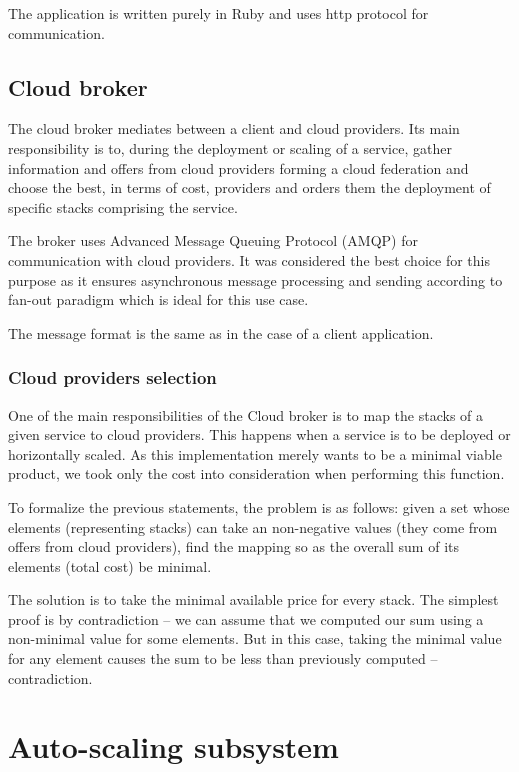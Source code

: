 The application is written purely in Ruby and uses http protocol for communication. 

\subsection{Cloud broker}
The cloud broker mediates between a client and cloud providers. Its main responsibility is to, during the deployment or scaling of a service, gather information and offers from cloud providers forming a cloud federation and choose the best, in terms of cost, providers and orders them the deployment of specific stacks comprising the service.

The broker uses Advanced Message Queuing Protocol (AMQP) for communication with cloud providers. It was considered the best choice for this purpose as it ensures asynchronous message processing and sending according to fan-out paradigm which is ideal for this use case.

The message format is the same as in the case of a client application.

\subsubsection{Cloud providers selection}
One of the main responsibilities of the Cloud broker is to map the stacks of a given service to cloud providers. This happens when a service is to be deployed or horizontally scaled. As this implementation merely wants to be a minimal viable product, we took only the cost into consideration when performing this function.

To formalize the previous statements, the problem is as follows: given a set whose elements (representing stacks) can take an non-negative values (they come from offers from cloud providers), find the mapping so as the overall sum of its elements (total cost) be minimal.

The solution is to take the minimal available price for every stack. The simplest proof is by contradiction -- we can assume that we computed our sum using a non-minimal value for some elements. But in this case, taking the minimal value for any element causes the sum to be less than previously computed -- contradiction.

\section{Auto-scaling subsystem}

